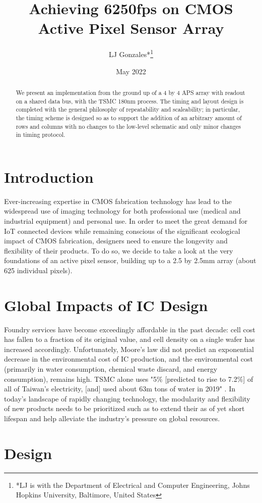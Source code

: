 \documentclass[lettersize,journal]{IEEEtran}
\title{Achieving 6250fps on CMOS Active Pixel Sensor Array}
\author{LJ Gonzales*\thanks{*LJ is with the Department of Electrical and Computer Engineering, Johns Hopkins University, Baltimore, United States}}
\date{May 2022}
\begin{document}
\maketitle
\begin{abstract} We present an implementation from the ground up of a 4 by 4 APS array with readout on a shared data bus, with the TSMC 180nm process. The timing and layout design is completed with the general philosophy of repeatability and scaleability; in particular, the timing scheme is designed so as to support the addition of an arbitrary amount of rows and columns with no changes to the low-level schematic and only minor changes in timing protocol.
\end{abstract}
\section{Introduction}
Ever-increasing expertise in CMOS fabrication technology has lead to the widespread use of imaging technology for both professional use (medical and industrial equipment) and personal use. In order to meet the great demand for IoT connected devices while remaining conscious of the significant ecological impact of CMOS fabrication, designers need to ensure the longevity and flexibility of their products. To do so, we decide to take a look at the very foundations of an active pixel sensor, building up to a 2.5 by 2.5mm array (about 625 individual pixels).
\section{Global Impacts of IC Design}
Foundry services have become exceedingly affordable in the past decade: cell cost has fallen to a fraction of its original value, and cell density on a single wafer has increased accordingly. Unfortunately, Moore's law did not predict an exponential decrease in the environmental cost of IC production, and the environmental cost (primarily in water consumption, chemical waste discard, and energy consumption), remains high. TSMC alone uses "5\% [predicted to rise to 7.2\%] of all of Taiwan's electricity, [and] used about 63m tons of water in 2019" \cite{environmental}.
In today's landscape of rapidly changing technology, the modularity and flexibility of new products needs to be prioritized such as to extend their as of yet short lifespan and help alleviate the industry's pressure on global resources.
\section{Design}
\end{document}
